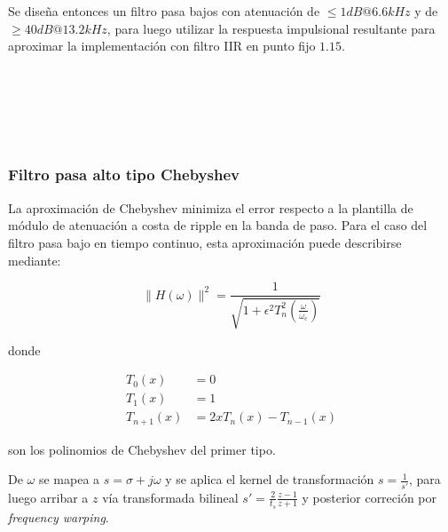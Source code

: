 \documentclass[11pt, journal]{IEEEtran}
\begin{document}
Se diseña entonces un filtro pasa bajos con atenuación de
\(\leq 1 dB @ 6.6 kHz\) y de \(\geq 40 dB @ 13.2 kHz\), para luego
utilizar la respuesta impulsional resultante para aproximar la
implementación con filtro IIR en punto fijo \(1.15\).


    \begin{center}
    \end{center}
    { \hspace*{\fill} \\}
    

    \begin{center}
    \end{center}
    { \hspace*{\fill} \\}
    

    \begin{center}
    \end{center}
    { \hspace*{\fill} \\}
    
    \subsubsection{Filtro pasa alto tipo Chebyshev}

La aproximación de Chebyshev minimiza el error respecto a la plantilla
de módulo de atenuación a costa de ripple en la banda de paso. Para el
caso del filtro pasa bajo en tiempo continuo, esta aproximación puede
describirse mediante:

\[
\|H(\omega)\|^2 = \frac{1}{\sqrt{1 + \epsilon^2 T^2_n(\frac{\omega}{\omega_c})}}
\]

donde


\begin{align}
T_0(x) &= 0 \\
T_1(x) &= 1 \\
T_{n+1}(x) &= 2x T_n(x) - T_{n-1}(x)
\end{align}


son los polinomios de Chebyshev del primer tipo.

De \(\omega\) se mapea a \(s = \sigma + j\omega\) y se aplica el kernel
de transformación \(s = \frac{1}{s'}\), para luego arribar a \(z\) vía
transformada bilineal \(s' = \frac{2}{t_s} \frac{z - 1}{z + 1}\) y
posterior correción por \emph{frequency warping}.
\end{document}

